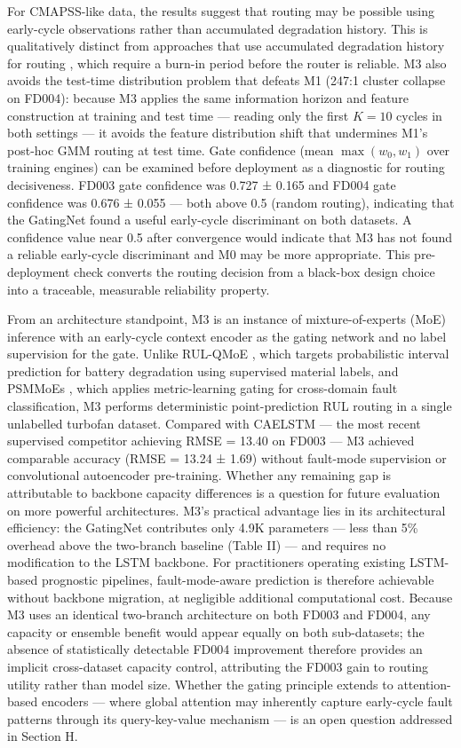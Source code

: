\documentclass[review,12pt]{elsarticle}
\begin{document}
For CMAPSS-like data, the results suggest that routing may be possible using early-cycle observations rather than accumulated degradation history. This is qualitatively distinct from approaches that use accumulated degradation history for routing \cite{ref30,ref31,ref33}, which require a burn-in period before the router is reliable. M3 also avoids the test-time distribution problem that defeats M1 (247:1 cluster collapse on FD004): because M3 applies the same information horizon and feature construction at training and test time --- reading only the first $K = 10$ cycles in both settings --- it avoids the feature distribution shift that undermines M1's post-hoc GMM routing at test time. Gate confidence (mean $\max(w_0, w_1)$ over training engines) can be examined before deployment as a diagnostic for routing decisiveness. FD003 gate confidence was 0.727 ± 0.165 and FD004 gate confidence was 0.676 ± 0.055 --- both above 0.5 (random routing), indicating that the GatingNet found a useful early-cycle discriminant on both datasets. A confidence value near 0.5 after convergence would indicate that M3 has not found a reliable early-cycle discriminant and M0 may be more appropriate. This pre-deployment check converts the routing decision from a black-box design choice into a traceable, measurable reliability property.

From an architecture standpoint, M3 is an instance of mixture-of-experts (MoE) inference \cite{ref32,ref43,ref44} with an early-cycle context encoder as the gating network and no label supervision for the gate. Unlike RUL-QMoE \cite{ref43}, which targets probabilistic interval prediction for battery degradation using supervised material labels, and PSMMoEs \cite{ref44}, which applies metric-learning gating for cross-domain fault classification, M3 performs deterministic point-prediction RUL routing in a single unlabelled turbofan dataset. Compared with CAELSTM \cite{ref15} --- the most recent supervised competitor achieving RMSE = 13.40 on FD003 --- M3 achieved comparable accuracy (RMSE = 13.24 ± 1.69) without fault-mode supervision or convolutional autoencoder pre-training. Whether any remaining gap is attributable to backbone capacity differences is a question for future evaluation on more powerful architectures. M3's practical advantage lies in its architectural efficiency: the GatingNet contributes only 4.9K parameters — less than 5\% overhead above the two-branch baseline (Table II) — and requires no modification to the LSTM backbone. For practitioners operating existing LSTM-based prognostic pipelines, fault-mode-aware prediction is therefore achievable without backbone migration, at negligible additional computational cost. Because M3 uses an identical two-branch architecture on both FD003 and FD004, any capacity or ensemble benefit would appear equally on both sub-datasets; the absence of statistically detectable FD004 improvement therefore provides an implicit cross-dataset capacity control, attributing the FD003 gain to routing utility rather than model size. Whether the gating principle extends to attention-based encoders \cite{ref08,ref13,ref14} — where global attention may inherently capture early-cycle fault patterns through its query-key-value mechanism — is an open question addressed in Section H.
\end{document}
